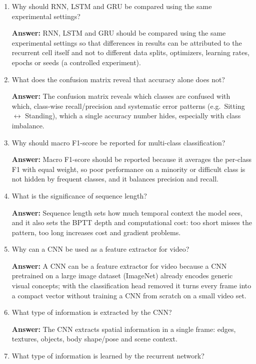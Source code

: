 \documentclass[10pt]{article}
\begin{document}
\begin{enumerate}
\item Why should RNN, LSTM and GRU be compared using the same experimental settings?

\textbf{Answer:} RNN, LSTM and GRU should be compared using the same
experimental settings so that differences in results can be attributed to
the recurrent cell itself and not to different data splits, optimizers,
learning rates, epochs or seeds (a controlled experiment).

\item What does the confusion matrix reveal that accuracy alone does not?

\textbf{Answer:} The confusion matrix reveals which classes are confused
with which, class-wise recall/precision and systematic error patterns
(e.g.\ Sitting $\leftrightarrow$ Standing), which a single accuracy number
hides, especially with class imbalance.

\item Why should macro F1-score be reported for multi-class classification?

\textbf{Answer:} Macro F1-score should be reported because it averages the
per-class F1 with equal weight, so poor performance on a minority or
difficult class is not hidden by frequent classes, and it balances
precision and recall.

\item What is the significance of sequence length?

\textbf{Answer:} Sequence length sets how much temporal context the model
sees, and it also sets the BPTT depth and computational cost: too short
misses the pattern, too long increases cost and gradient problems.

\item Why can a CNN be used as a feature extractor for video?

\textbf{Answer:} A CNN can be a feature extractor for video because a CNN
pretrained on a large image dataset (ImageNet) already encodes generic
visual concepts; with the classification head removed it turns every frame
into a compact vector without training a CNN from scratch on a small video
set.

\item What type of information is extracted by the CNN?

\textbf{Answer:} The CNN extracts spatial information in a single frame:
edges, textures, objects, body shape/pose and scene context.

\item What type of information is learned by the recurrent network?


\end{enumerate}
\end{document}
